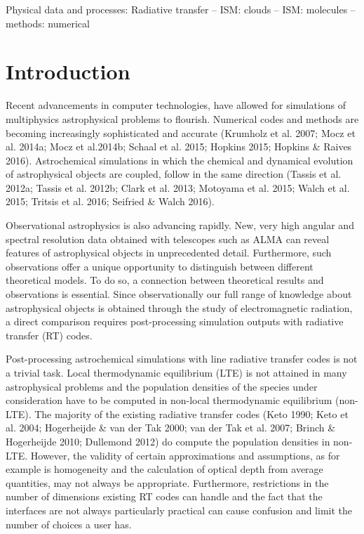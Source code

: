 \documentclass{mn2e}
\begin{document}
\begin{keywords}
Physical data and processes: Radiative transfer -- ISM: clouds -- ISM: molecules -- methods: numerical
\end{keywords}

\section{Introduction}\label{intro}

Recent advancements in computer technologies, have allowed for simulations of multiphysics astrophysical problems to flourish. Numerical codes and methods are becoming increasingly sophisticated and accurate (Krumholz et al. 2007; Mocz et al. 2014a; Mocz et al.2014b; Schaal et al. 2015; Hopkins 2015; Hopkins \& Raives 2016). Astrochemical simulations in which the chemical and dynamical evolution of astrophysical objects are coupled, follow in the same direction (Tassis et al. 2012a; Tassis et al. 2012b; Clark et al. 2013; Motoyama et al. 2015; Walch et al. 2015; Tritsis et al. 2016; Seifried \& Walch 2016). 

Observational astrophysics is also advancing rapidly. New, very high angular and spectral resolution data obtained with telescopes such as ALMA can reveal features of astrophysical objects in unprecedented detail. Furthermore, such observations offer a unique opportunity to distinguish between different theoretical models. To do so, a connection between theoretical results and observations is essential. Since observationally our full range of knowledge about astrophysical objects is obtained through the study of electromagnetic radiation, a direct comparison requires post-processing simulation outputs with radiative transfer (RT) codes. 

Post-processing astrochemical simulations with line radiative transfer codes is not a trivial task. Local thermodynamic equilibrium (LTE) is not attained in many astrophysical problems and the population densities of the species under consideration have to be computed in non-local thermodynamic equilibrium (non-LTE). The majority of the existing radiative transfer codes (Keto 1990; Keto et al. 2004; Hogerheijde \& van der Tak 2000; van der Tak et al. 2007; Brinch \& Hogerheijde 2010; Dullemond 2012) do compute the population densities in non-LTE. However, the validity of certain approximations and assumptions, as for example is homogeneity and the calculation of optical depth from average quantities, may not always be appropriate. Furthermore, restrictions in the number of dimensions existing RT codes can handle and the fact that the interfaces are not always particularly practical can cause confusion and limit the number of choices a user has.
\end{document}
